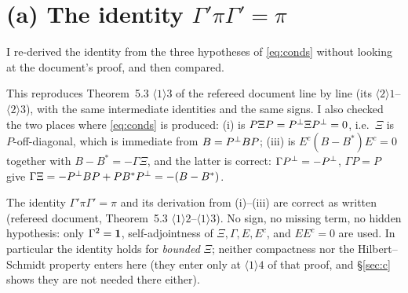 \documentclass[11pt]{article}
\begin{document}
\section{(a) The identity $\Gamma'\pi\Gamma'=\pi$}\label{sec:a}

I re-derived the identity from the three hypotheses of \eqref{eq:conds} without looking at
the document's proof, and then compared.


This reproduces Theorem~5.3 $\langle1\rangle3$ of the refereed document line by line
(its $\langle2\rangle1$--$\langle2\rangle3$), with the same intermediate identities and the
same signs.  I also checked the two places where \eqref{eq:conds} is produced:
(i) is $P\Xi P=P^{\perp}\Xi P^{\perp}=0$, i.e.\ $\Xi$ is $P$-off-diagonal, which is immediate from
$B=P^{\perp} BP$; (iii) is $E^c(B-B^*)E^c=0$ together with $B-B^*=-\Gamma\Xi$, and the latter
is correct: $\Gamma P^{\perp}=-P^{\perp}$, $\Gamma P=P$ give
$\Gamma\Xi=-P^{\perp} BP+PB^*P^{\perp}=-(B-B^*)$.

\begin{verdictok}
The identity $\Gamma'\pi\Gamma'=\pi$ and its derivation from (i)--(iii) are correct as
written (refereed document, Theorem~5.3 $\langle1\rangle2$--$\langle1\rangle3$).  No sign,
no missing term, no hidden hypothesis: only $\Gamma^2=\mathbf 1$, self-adjointness of
$\Xi,\Gamma,E,E^c$, and $EE^c=0$ are used.  In particular the identity holds for
\emph{bounded} $\Xi$; neither compactness nor the Hilbert--Schmidt property enters here
(they enter only at $\langle1\rangle4$ of that proof, and \S\ref{sec:c} shows they are not
needed there either).
\end{verdictok}
\end{document}
